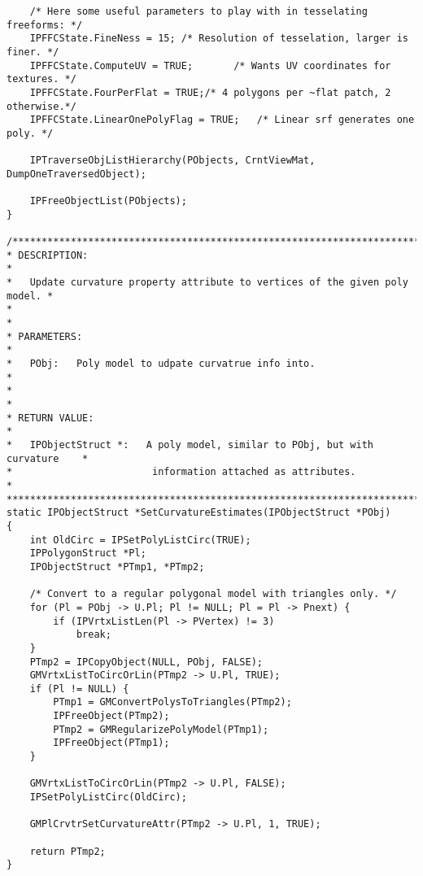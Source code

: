 \begin{verbatim}
    /* Here some useful parameters to play with in tesselating freeforms: */
    IPFFCState.FineNess = 15; /* Resolution of tesselation, larger is finer. */
    IPFFCState.ComputeUV = TRUE;       /* Wants UV coordinates for textures. */
    IPFFCState.FourPerFlat = TRUE;/* 4 polygons per ~flat patch, 2 otherwise.*/
    IPFFCState.LinearOnePolyFlag = TRUE;   /* Linear srf generates one poly. */

    IPTraverseObjListHierarchy(PObjects, CrntViewMat, DumpOneTraversedObject);

    IPFreeObjectList(PObjects);
}

/*****************************************************************************
* DESCRIPTION:                                                               *
*   Update curvature property attribute to vertices of the given poly model. *
*                                                                            *
* PARAMETERS:                                                                *
*   PObj:   Poly model to udpate curvatrue info into.                             *
*                                                                            *
* RETURN VALUE:                                                              *
*   IPObjectStruct *:   A poly model, similar to PObj, but with curvature    *
*                        information attached as attributes.                  *
*****************************************************************************/
static IPObjectStruct *SetCurvatureEstimates(IPObjectStruct *PObj)
{
    int OldCirc = IPSetPolyListCirc(TRUE);
    IPPolygonStruct *Pl;
    IPObjectStruct *PTmp1, *PTmp2;

    /* Convert to a regular polygonal model with triangles only. */
    for (Pl = PObj -> U.Pl; Pl != NULL; Pl = Pl -> Pnext) {
        if (IPVrtxListLen(Pl -> PVertex) != 3)
            break;
    }
    PTmp2 = IPCopyObject(NULL, PObj, FALSE);
    GMVrtxListToCircOrLin(PTmp2 -> U.Pl, TRUE);
    if (Pl != NULL) {
        PTmp1 = GMConvertPolysToTriangles(PTmp2);
        IPFreeObject(PTmp2);
        PTmp2 = GMRegularizePolyModel(PTmp1);
        IPFreeObject(PTmp1);
    }

    GMVrtxListToCircOrLin(PTmp2 -> U.Pl, FALSE);
    IPSetPolyListCirc(OldCirc);

    GMPlCrvtrSetCurvatureAttr(PTmp2 -> U.Pl, 1, TRUE);

    return PTmp2;
}


\end{verbatim}
